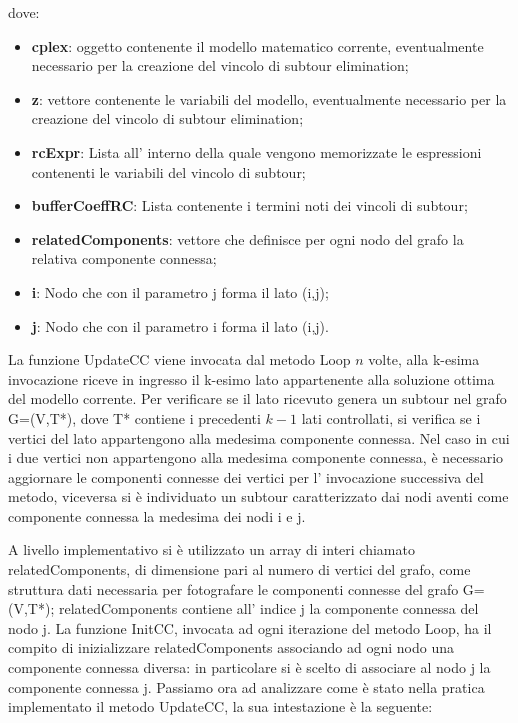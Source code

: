 \documentclass[11pt]{article}
\begin{document}
dove:

\begin{itemize}
	\item \textbf{cplex}: oggetto contenente il modello matematico corrente, eventualmente necessario per la creazione del vincolo di subtour elimination;
	\item \textbf{z}: vettore contenente le variabili del modello, eventualmente necessario per la creazione del vincolo di subtour elimination;
	\item \textbf{rcExpr}: Lista all' interno della quale vengono memorizzate le espressioni contenenti le variabili del vincolo di subtour;
	\item \textbf{bufferCoeffRC}: Lista contenente i termini noti dei vincoli di subtour;
	\item \textbf{relatedComponents}: vettore che definisce per ogni nodo del grafo la relativa componente connessa;
	\item \textbf{i}: Nodo che con il parametro j forma il lato (i,j);
	\item \textbf{j}: Nodo che con il parametro i forma il lato (i,j).
\end{itemize}

La funzione UpdateCC viene invocata dal metodo Loop $n$ volte, alla k-esima invocazione riceve in ingresso il k-esimo lato appartenente alla soluzione ottima del modello corrente. Per verificare se il lato ricevuto genera un subtour nel grafo G=(V,T*), dove T* contiene i precedenti $k-1$ lati controllati, si verifica se i vertici del lato appartengono alla medesima componente connessa. Nel caso in cui i due vertici non appartengono alla medesima componente connessa, \`e necessario aggiornare le componenti connesse dei vertici per l' invocazione successiva del metodo, viceversa si \`e  individuato un subtour caratterizzato dai nodi aventi come componente connessa la medesima dei nodi i e j.

A livello implementativo si \`e utilizzato un array di interi chiamato relatedComponents, di dimensione pari al numero di vertici del grafo, come struttura dati necessaria per fotografare le componenti connesse del grafo G=(V,T*); relatedComponents contiene all' indice j la componente connessa del nodo j. La funzione InitCC, invocata ad ogni iterazione del metodo Loop, ha il compito di inizializzare relatedComponents associando ad ogni nodo una componente connessa diversa: in particolare si \`e  scelto di associare al nodo j la componente connessa j. Passiamo ora ad analizzare come \`e  stato nella pratica implementato il metodo UpdateCC, la sua intestazione \`e la seguente:
\end{document}

